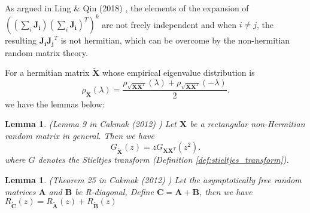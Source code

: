 \documentclass[10pt,journal,compsoc]{IEEEtran}
\newtheorem{lemma}[theorem]{Lemma}
\begin{document}
As argued in Ling \& Qiu (2018) \cite{ling2018spectrum}, the elements of the expansion of $\left(\left(\sum_i\mathbf{J_i}\right)\left(\sum_i\mathbf{J_i}\right)^T\right)^k$ are not freely independent and when $i\ne j$, the resulting $\mathbf{J_iJ_j}^T$ is not hermitian, which can be overcome by the non-hermitian random matrix theory\cite{cakmak2012non,ling2018spectrum}. 

For a hermitian matrix $\widetilde{\mathbf{X}}$ whose empirical eigenvalue distribution is 
\begin{equation}
    \rho_{\widetilde{\mathbf{X}}}(\lambda) = \frac{\rho_{\sqrt{\mathbf{XX}^T}}(\lambda) + \rho_{\sqrt{\mathbf{XX}^T}}(-\lambda)}{2}.
\end{equation}
we have the lemmas below:

\begin{lemma}
(Lemma 9 in Cakmak (2012) \cite{cakmak2012non}) Let $\mathbf{X}$ be a rectangular non-Hermitian random matrix in general. Then we have
\begin{equation}
    G_{\widetilde{\mathbf{X}}}(z)=zG_{\mathbf{XX}^T}(z^2).
\label{equ:lemmaxxxt}
\end{equation}
where $G$ denotes the Stieltjes transform (Definition \ref{def:stieltjes_transform}).
\label{lemma:lemmaxxxt}
\end{lemma}

\begin{lemma}
(Theorem 25 in Cakmak (2012) \cite{cakmak2012non}) Let the asymptotically free random matrices $\mathbf{A}$ and $\mathbf{B}$ be R-diagonal, Define $\mathbf{C}=\mathbf{A}+\mathbf{B}$, then we have $R_{\widetilde{\mathbf{C}}}(z) = R_{\widetilde{\mathbf{A}}}(z) + R_{\widetilde{\mathbf{B}}}(z)$
\label{lemma:r-diagonal-R-transform}
\end{lemma}
\end{document}
